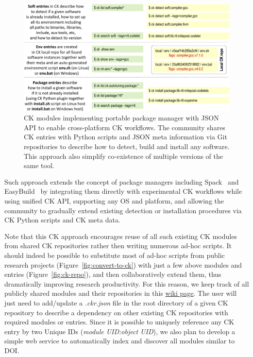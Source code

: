    \begin{figure}[ht]
     \centering
      \includegraphics[width=5.6in]
      {ck-assets/01714ac89d5bd629-cropped.pdf} %
     \caption{
   CK modules implementing portable package manager with JSON API to enable cross-platform CK workflows.
   The community shares CK entries with Python scripts and JSON meta information via Git repositories
   to describe how to detect, build and install any software. This approach also simplify
   co-existence of multiple versions of the same tool.
     }
     \label{fig:portable-package-manager}
   \end{figure}

Such approach extends the concept of package managers including
Spack~\cite{Gamblin:2015:SPM:2807591.2807623} and EasyBuild~\cite{DBLP:conf/sc/HosteTGW12}
by integrating them directly with experimental CK workflows while using unified CK API,
supporting any OS and platform, and allowing the community to gradually extend existing
detection or installation procedures via CK Python scripts and CK meta data.

Note that this CK approach encourages reuse of all such existing CK modules
from shared CK repositories rather then writing numerous ad-hoc scripts.
%
It should indeed be possible to substitute most of ad-hoc scripts
from public research projects (Figure~\ref{fig:convert-to-ck})
with just a few above modules and entries (Figure~\ref{fig:ck-repo}),
and then collaboratively extend them, thus dramatically improving research productivity.
%
For this reason, we keep track of all publicly shared modules and their repositories
in this \href{https://github.com/ctuning/ck/wiki/Shared-modules}{wiki page}.
%
The user will just need to add/update a \textit{.ckr.json} file
in the root directory of a given CK repository to describe a dependency
on other existing CK repositories with required modules or entries.
%
Since it is possible to uniquely reference any CK entry by two Unique IDs
(\textit{module UID:object UID}), we also plan to develop a simple web service
to automatically index and discover all modules similar to DOI.


